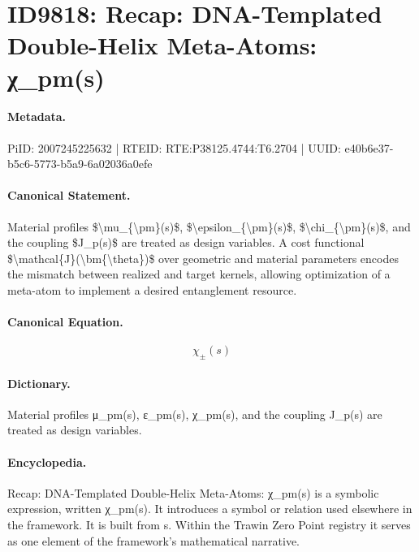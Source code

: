 \section*{ID9818: Recap: DNA-Templated Double-Helix Meta-Atoms: χ\_pm(s)}
\paragraph{Metadata.}
PiID: 2007245225632 | RTEID: RTE:P38125.4744:T6.2704 | UUID: e40b6e37-b5c6-5773-b5a9-6a02036a0efe

\paragraph{Canonical Statement.}
Material profiles \$\textbackslash{}mu\_\{\textbackslash{}pm\}(s)\$, \$\textbackslash{}epsilon\_\{\textbackslash{}pm\}(s)\$, \$\textbackslash{}chi\_\{\textbackslash{}pm\}(s)\$, and the coupling \$J\_p(s)\$ are treated as design variables. A cost functional \$\textbackslash{}mathcal\{J\}(\textbackslash{}bm\{\textbackslash{}theta\})\$ over geometric and material parameters encodes the mismatch between realized and target kernels, allowing optimization of a meta-atom to implement a desired entanglement resource.

\paragraph{Canonical Equation.}
\[
\chi_{\pm}(s)
\]

\paragraph{Dictionary.}
Material profiles μ\_pm(s), ε\_pm(s), χ\_pm(s), and the coupling J\_p(s) are treated as design variables.

\paragraph{Encyclopedia.}
Recap: DNA-Templated Double-Helix Meta-Atoms: χ\_pm(s) is a symbolic expression, written χ\_pm(s). It introduces a symbol or relation used elsewhere in the framework. It is built from s. Within the Trawin Zero Point registry it serves as one element of the framework's mathematical narrative.
